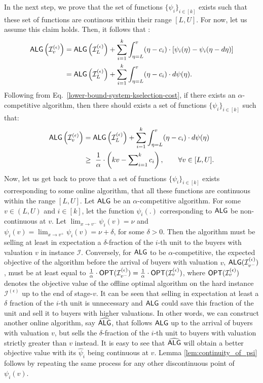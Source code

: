 In the next step, we prove that the set of functions  $\{\psi_i\}_{i \in [k]}$ exists such that these set of functions are continous within their range $[L,U]$. For now, let us assume this claim holds. Then, it follows that :
\begin{align*}
    \textsf{ALG}\left(\mathcal{I}_{v}^{(\epsilon)}\right) &= \textsf{ALG}\left(\mathcal{I}_{L}^{(\epsilon)}\right) + \sum_{i=1}^{k} \int_{\eta = L}^{v} (\eta-c_i) \cdot \left [ \psi_i(\eta) - \psi_i(\eta - d\eta) \right ]\\
    & = \textsf{ALG}\left(\mathcal{I}_{L}^{(\epsilon)}\right) + \sum_{i=1}^{k} \int_{\eta = L}^{v} (\eta-c_i) \cdot  d\psi(\eta).
\end{align*}
 Following from Eq.~\eqref{lower-bound-system-kselection-cost}, if there exists an $\alpha$-competitive algorithm, then there should exists a set of functions  $\{\psi_i\}_{i \in [k]}$ such that:
\begin{align*}
 \textsf{ALG}\left(\mathcal{I}_{v}^{(\epsilon)}\right) & = \textsf{ALG}\left(\mathcal{I}_{L}^{(\epsilon)}\right) + \sum_{i=1}^{k} \int_{\eta = L}^{v} (\eta-c_i) \cdot  d\psi(\eta) \\
 & \ge\ \frac{1}{\alpha} \cdot \left(k v - \sum\nolimits_{i=1}^k c_{i}\right), \qquad \forall v \in [L,U].
\end{align*}
Now, let us get back to prove that a set of functions $\{\psi_i\}_{i \in [k]}$ exists corresponding to some online algorithm, that all these functions are continuous within the range $[L,U]$.
Let $\textsf{ALG}$ be an $\alpha$-competitive algorithm. For some $v \in (L,U)$ and $i \in [k]$, let the function $\psi_{i}(.)$ corresponding to $\textsf{ALG}$ be non-continuous at $v$. 
Let $\lim_{x \rightarrow v^{-}} \psi_{i}(v) = \nu$ and $\psi_{i}(v) = \lim_{x \rightarrow v^{+}} \psi_{i}(v) = \nu + \delta$, for some $\delta > 0$.  Then the algorithm must be selling at least in expectation a $\delta$-fraction of the $i$-th unit to the buyers with valuation $v$ in instance $\mathcal{I}$. 
Conversely, for $\textsf{ALG}$ to be $\alpha$-competitive, the expected objective of the algorithm before the arrival of buyers with valuation $v$, $\textsf{ALG}(\mathcal{I}_{v^{-}}^{(\epsilon)})$, must be
at least equal to $\frac{1}{\alpha} \cdot \textsf{OPT}(\mathcal{I}_{v^{-}}^{(\epsilon)}) = \frac{1}{\alpha} \cdot \textsf{OPT}(\mathcal{I}_{v}^{(\epsilon)})$, where $ \textsf{OPT}(\mathcal{I}_{v}^{(\epsilon)}) $ denotes the objective value of the offline optimal algorithm on the hard instance $ \mathcal{I}^{(\epsilon)} $ up to the end of stage-$v$. 
It can be seen that selling in expectation at least a $\delta $ fraction of the $i$-th unit is unnecessary and $\textsf{ALG}$ could save this fraction of the unit and sell it to buyers with higher valuations. In other words, 
we can construct another online algorithm, say $\widehat{\textsf{ALG}}$, that follows $\textsf{ALG}$ up to the arrival of buyers with valuation  $v$, 
but sells the $\delta$-fraction of the $i$-th unit to buyers with valuation strictly greater than $v$ instead. It is easy to see that  $\widehat{\textsf{ALG}}$ will obtain a better objective value with its $ \hat{\psi}_{i}$ being continuous at $v$. Lemma \ref{lem:continuity_of_psi} follows by repeating the same process for any other discontinuous point of $ \psi_i(v) $.

